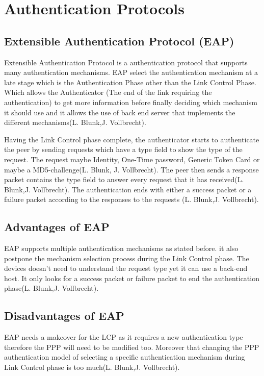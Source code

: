 \chapter{Authentication Protocols}
\label{chap:auth_protocol}

\section{Extensible Authentication Protocol (EAP)}
Extensible Authentication Protocol is a authentication protocol that supports many authentication mechanisms. EAP select the authentication mechanism at a late stage which is the Authentication Phase other than the Link Control Phase. Which allows the Authenticator (The end of the link requiring the authentication) to get more information before finally deciding which mechanism it should use and it allows the use of back end server that implements the different mechanisms(L. Blunk,J. Vollbrecht).

Having the Link Control phase complete, the authenticator starts to authenticate the peer by sending requests which have a type field to show the type of the request. The request maybe Identity, One-Time password, Generic Token Card or maybe a MD5-challenge(L. Blunk, J. Vollbrecht). The peer then sends a response packet contains the type field to answer every request that it has received(L. Blunk,J. Vollbrecht). The authentication ends with either a success packet or a failure packet according to the responses to the requests (L. Blunk,J. Vollbrecht).


\section{Advantages of EAP}

EAP supports multiple authentication mechanisms as stated before. it also postpone the mechanism selection process during the Link Control phase. The devices doesn't need to understand the request type yet it can use a back-end host. It only looks for a success packet or failure packet to end the authentication phase(L. Blunk,J. Vollbrecht).

\section{Disadvantages of EAP}

EAP needs a makeover for the LCP as it requires a new authentication type therefore the PPP will need to be modified too. Moreover that changing the PPP authentication model of selecting a specific authentication mechanism during Link Control phase is too much(L. Blunk,J. Vollbrecht).


